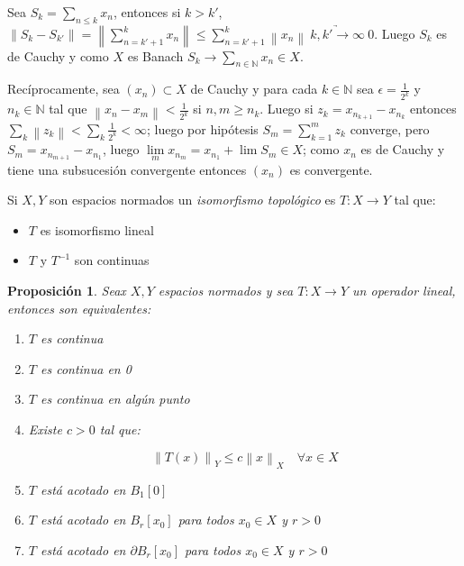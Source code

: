 \documentclass[11pt]{article}
\newcommand{\N}{{\mathbb{N}}}
\newcommand{\norm}[1]{\left\lVert#1\right\rVert}
\newcommand{\Bigsum}[2]{\sum\limits_{#1}{#2}}
\numberwithin{theorem}{subsection}
\newtheorem{proposition}[theorem]{Proposici\'on}
\newenvironment{proof}[1][Demostraci\'on]{\begin{trivlist}
		\item[\hskip \labelsep {\bfseries #1}]}{\end{trivlist}}
\newenvironment{definition}[1][Definici\'on]{\begin{trivlist}
		\item[\hskip \labelsep {\bfseries #1}]}{\end{trivlist}}
\newcommand{\qed}{\nobreak \ifvmode \relax \else
	\ifdim\lastskip<1.5em \hskip-\lastskip
	\hskip1.5em plus0em minus0.5em \fi \nobreak
	\vrule height0.75em width0.5em depth0.25em\fi}
\begin{document}
\begin{proof}
	Sea $S_k = \Bigsum{n \leq k}{x_n}$, entonces si $k > k'$, $\norm{S_{k} - S_{k'}} = \norm{\sum\limits_{n = k'+1}^{k}{x_n}} \leq \sum\limits_{n = k'+1}^{k}{\norm{x_n}} \ \underrightarrow{k,k' \rightarrow \infty} \ 0$. Luego $S_k$ es de Cauchy y como $X$ es Banach $S_k \rightarrow \Bigsum{n \in \N}{x_n} \in X$.
	
	Rec\'iprocamente, sea $\left(x_n\right) \subset X$ de Cauchy y para cada $k \in \N$ sea $\epsilon = \frac{1}{2^k}$ y $n_k \in \N$ tal que $\norm{x_{n} - x_m} < \frac{1}{2^k}$ si $n,m \geq n_k$. Luego si $z_k = x_{n_{k+1}} - x_{n_k}$ entonces $\Bigsum{k}{\norm{z_k}} < \Bigsum{k}{\frac{1}{2^k}} < \infty$; luego por hip\'otesis $S_m = \sum\limits_{k=1}^{m}{z_k}$ converge, pero $S_m = x_{n_{m+1}} - x_{n_1}$, luego $\lim\limits_{m} {x_{n_m}} = x_{n_1} + \lim S_m \in X$; como $x_n$ es de Cauchy y tiene una subsucesi\'on convergente entonces $(x_n)$ es convergente. \qed
	
\end{proof}

\begin{definition}
	Si $X,Y$ son espacios normados un \textit{isomorfismo topol\'ogico} es $T : X \rightarrow Y$ tal que:
	
	\begin{itemize}
		\item $T$ es isomorfismo lineal
		\item $T$ y $T^{-1}$ son continuas
	\end{itemize}
	
\end{definition}

\begin{proposition}
	\label{Continuidad de un operador}
	Seax $X,Y$ espacios normados y sea $T : X \rightarrow Y$ un operador lineal, entonces son equivalentes:
	
	\begin{enumerate}
		\item $T$ es continua
		\item $T$ es continua en 0
		\item $T$ es continua en alg\'un punto
		\item Existe $c > 0$ tal que:
		
		\begin{equation}
		\label{eq: Operador acotado}
		\norm{T(x)}_Y \leq c \norm{x}_X \quad \forall x \in X
		\end{equation}
		\item $T$ est\'a acotado en $B_1[0]$
		\item $T$ est\'a acotado en $B_r[x_0]$ para todos $x_0 \in X$ y $r > 0$
		\item $T$ est\'a acotado en $\partial B_r[x_0]$ para todos $x_0 \in X$ y $r > 0$
	\end{enumerate}
\end{proposition}
\end{document}

